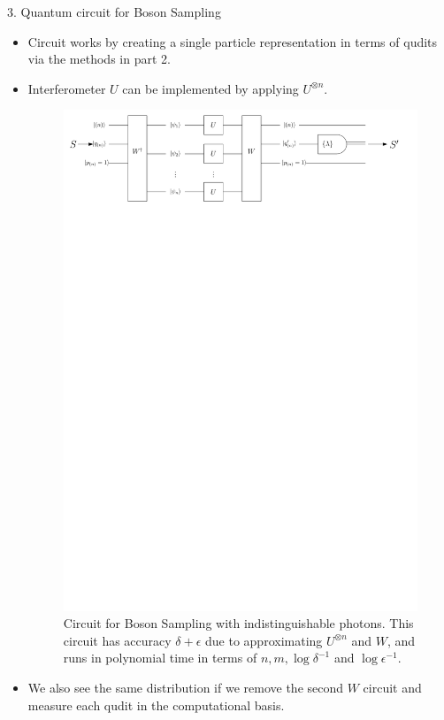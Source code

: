 \documentclass[]{templates/poster}
\begin{document}
\begin{frame}{}
\begin{columns}[t]
\begin{column}{0.422\linewidth}
  \begin{block}{\Large 3. Quantum circuit for Boson Sampling}
  \begin{itemize}
  \item Circuit works by creating a single particle representation in terms of qudits via the methods in part 2.
  \item Interferometer $U$ can be implemented by applying $U^{\otimes n}$.
  \begin{center}
  \begin{figure}
  \includegraphics[width=\linewidth]{noiseless_circuit_irrep}
  \caption{\label{fig:noiseless-circuit} Circuit for Boson Sampling with indistinguishable photons. This circuit has accuracy $\delta + \epsilon$ due to approximating $U^{\otimes n}$ and $W$, and runs in polynomial time in terms of $n, m, \log\delta^{-1}$ and $\log\epsilon^{-1}$.}
  \end{figure}
  \end{center}
  \item We also see the same distribution if we remove the second $W$ circuit and measure each qudit in the computational basis.
  \end{itemize}
  \end{block}
  \end{column}


\end{columns}
\end{frame}
\end{document}
